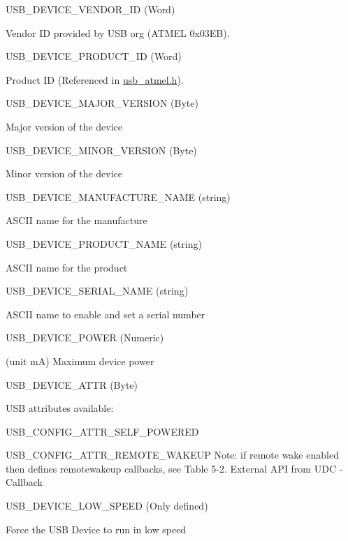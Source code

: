 \-U\-S\-B\-\_\-\-D\-E\-V\-I\-C\-E\-\_\-\-V\-E\-N\-D\-O\-R\-\_\-\-I\-D (\-Word)\par
 \-Vendor \-I\-D provided by \-U\-S\-B org (\-A\-T\-M\-E\-L 0x03\-E\-B).

\-U\-S\-B\-\_\-\-D\-E\-V\-I\-C\-E\-\_\-\-P\-R\-O\-D\-U\-C\-T\-\_\-\-I\-D (\-Word)\par
 \-Product \-I\-D (\-Referenced in \hyperlink{usb__atmel_8h}{usb\-\_\-atmel.\-h}).

\-U\-S\-B\-\_\-\-D\-E\-V\-I\-C\-E\-\_\-\-M\-A\-J\-O\-R\-\_\-\-V\-E\-R\-S\-I\-O\-N (\-Byte)\par
 \-Major version of the device

\-U\-S\-B\-\_\-\-D\-E\-V\-I\-C\-E\-\_\-\-M\-I\-N\-O\-R\-\_\-\-V\-E\-R\-S\-I\-O\-N (\-Byte)\par
 \-Minor version of the device

\-U\-S\-B\-\_\-\-D\-E\-V\-I\-C\-E\-\_\-\-M\-A\-N\-U\-F\-A\-C\-T\-U\-R\-E\-\_\-\-N\-A\-M\-E (string)\par
 \-A\-S\-C\-I\-I name for the manufacture

\-U\-S\-B\-\_\-\-D\-E\-V\-I\-C\-E\-\_\-\-P\-R\-O\-D\-U\-C\-T\-\_\-\-N\-A\-M\-E (string)\par
 \-A\-S\-C\-I\-I name for the product

\-U\-S\-B\-\_\-\-D\-E\-V\-I\-C\-E\-\_\-\-S\-E\-R\-I\-A\-L\-\_\-\-N\-A\-M\-E (string)\par
 \-A\-S\-C\-I\-I name to enable and set a serial number

\-U\-S\-B\-\_\-\-D\-E\-V\-I\-C\-E\-\_\-\-P\-O\-W\-E\-R (\-Numeric)\par
 (unit m\-A) \-Maximum device power

\-U\-S\-B\-\_\-\-D\-E\-V\-I\-C\-E\-\_\-\-A\-T\-T\-R (\-Byte)\par
 \-U\-S\-B attributes available\-:
\begin{DoxyItemize}
\item \-U\-S\-B\-\_\-\-C\-O\-N\-F\-I\-G\-\_\-\-A\-T\-T\-R\-\_\-\-S\-E\-L\-F\-\_\-\-P\-O\-W\-E\-R\-E\-D
\item \-U\-S\-B\-\_\-\-C\-O\-N\-F\-I\-G\-\_\-\-A\-T\-T\-R\-\_\-\-R\-E\-M\-O\-T\-E\-\_\-\-W\-A\-K\-E\-U\-P \-Note\-: if remote wake enabled then defines remotewakeup callbacks, see \-Table 5-\/2. \-External \-A\-P\-I from \-U\-D\-C -\/ \-Callback
\end{DoxyItemize}

\-U\-S\-B\-\_\-\-D\-E\-V\-I\-C\-E\-\_\-\-L\-O\-W\-\_\-\-S\-P\-E\-E\-D (\-Only defined)\par
 \-Force the \-U\-S\-B \-Device to run in low speed

